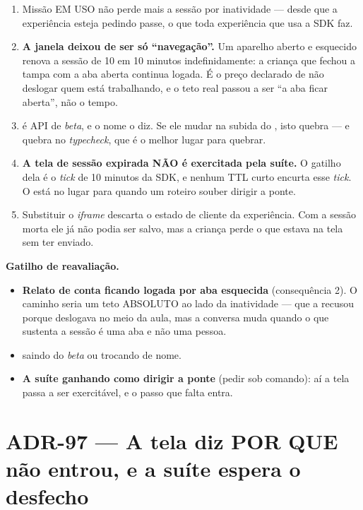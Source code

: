 \begin{enumerate}
  \item Missão EM USO não perde mais a sessão por inatividade --- desde que a
    experiência esteja pedindo passe, o que toda experiência que usa a SDK faz.
  \item \textbf{A janela deixou de ser só \enquote{navegação}.} Um aparelho
    aberto e esquecido renova a sessão de 10 em 10 minutos indefinidamente: a
    criança que fechou a tampa com a aba aberta continua logada. É o preço
    declarado de não deslogar quem está trabalhando, e o teto real passou a ser
    \enquote{a aba ficar aberta}, não o tempo.
  \item {} é API de \emph{beta}, e o nome o diz. Se ele mudar
    na subida do , isto quebra --- e quebra no \emph{typecheck},
    que é o melhor lugar para quebrar.
  \item \textbf{A tela de sessão expirada NÃO é exercitada pela suíte.} O
    gatilho dela é o \emph{tick} de 10 minutos da SDK, e nenhum TTL curto
    encurta esse \emph{tick}. O  está no lugar
    para quando um roteiro souber dirigir a ponte.
  \item Substituir o \emph{iframe} descarta o estado de cliente da experiência.
    Com a sessão morta ele já não podia ser salvo, mas a criança perde o que
    estava na tela sem ter enviado.
\end{enumerate}

\textbf{Gatilho de reavaliação.}
\begin{itemize}
  \item \textbf{Relato de conta ficando logada por aba esquecida} (consequência
    2). O caminho seria um teto ABSOLUTO ao lado da inatividade --- que a
     recusou porque deslogava no meio da aula, mas a conversa muda
    quando o que sustenta a sessão é uma aba e não uma pessoa.
  \item {} saindo do \emph{beta} ou trocando de nome.
  \item \textbf{A suíte ganhando como dirigir a ponte} (pedir
     sob comando): aí a tela passa a ser exercitável, e
    o passo que falta entra.
\end{itemize}

\section{ADR-97 --- A tela diz POR QUE não entrou, e a suíte espera o desfecho}
\label{adr:recusa-de-login-na-tela}

